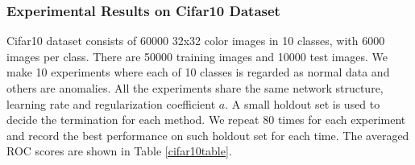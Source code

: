 \documentclass[a4paper,conference]{IEEEtran}
\begin{document}
%
%
%
%


\subsubsection{Experimental Results on Cifar10 Dataset}
Cifar10 dataset consists of 60000 32x32 color images in 10 classes, with 6000 images per class. There are 50000 training images and 10000 test images.
We make 10 experiments where each of 10 classes is regarded as normal data and others are anomalies. All the experiments share the same network structure,  learning rate and regularization coefficient $a$. A small holdout set is used to decide the termination for each method. We repeat 80 times for each experiment and record the best performance on such holdout set for each time. The averaged ROC scores are shown in Table \ref{cifar10table}.
\end{document}

